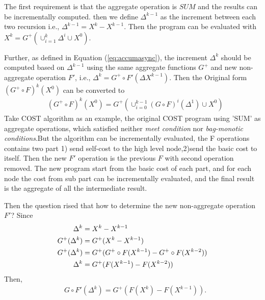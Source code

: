 {\color{red}

The first requirement is that the aggregate operation is $SUM$ and the results can be incrementally computed. then we define $\Delta^{k-1}$ as the increment between each two recursion i.e., $\Delta^{k-1}=X^k-X^{k-1}$. Then the program can be evaluated with $X^k=G^+(\cup_{i=1}^{k}\Delta^i\cup X^0)$.

Further, as defined in Equation (\ref{eq:accumasync}), the increment $\Delta^{k}$ should be computed based on $\Delta^{k-1}$ using the same aggregate functions $G^+$ and new non-aggregate operation $F'$, i.e., $\Delta^{k}=G^+\circ F'(\Delta X^{k-1})$.
Then the Original form $(G^+\circ F)^k(X^0)$ can be converted to 
\begin{equation}
\label{eq:convertform}
\begin{aligned}
&(G^+\circ F)^k(X^0)
=G^+( \cup_{i=0}^{k-1}{(G\circ F)^i(\Delta^{1})\cup X^0})
\end{aligned}
\end{equation}
Take COST algorithm as an example, the original COST program using 'SUM' as aggregate operations, which satisfied neither \emph{meet condition} nor \emph{bag-monotic conditions}.But the algorithm can be incrementally evaluated, the F operations contains two part 1) send self-cost to the high level node,2)send the basic cost to itself.  Then the new $F'$ operation is the previous $F$ with second operation removed. The new program start from the basic cost of each part, and for each node the cost from sub part can be incrementally evaluated, and the final result is the aggregate of all the intermediate result.  

Then the question rised that how to determine the new non-aggregate operation $F'$? Since
\begin{equation}
\label{eq:inferr}
\begin{aligned}
\Delta^k&=X^k-X^{k-1}\\
G^+(\Delta^{k})&=G^+(X^k-X^{k-1})\\
G^+(\Delta^{k})&=G^+(G^+\circ F(X^{k-1})-G^+\circ F(X^{k-2}))\\
\Delta^{k}&=G^+(F(X^{k-1})-F(X^{k-2}))\notag
\end{aligned}
\end{equation}
Then,
\begin{equation}
\label{eq:findf}
\begin{aligned}
&G\circ F'(\Delta^{k})=G^+(F(X^{k})-F(X^{k-1})).
\end{aligned}
\end{equation}
}

